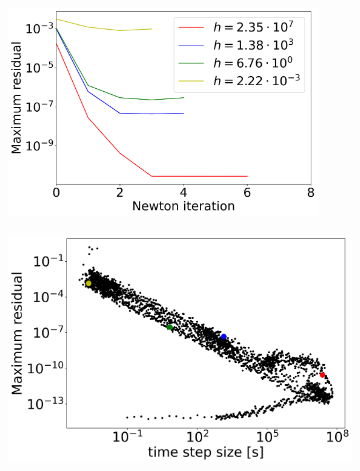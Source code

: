 \begin{figure}[H]
	\centering
	\begin{subfigure}[t]{0.32\textwidth}
		\centering
		\includegraphics[width=0.9\textwidth]{images/TANDEMConvergenceAnalysisCompactDAENewton_Size5.png}
		\label{fig:convergenceIssuesCompactDAENewtonIterations}
\end{subfigure}
	\begin{subfigure}[t]{0.32\textwidth}
		\centering
		\includegraphics[width=1\textwidth]{images/TANDEMConvergenceAnalysisCompactDAEMaxResidual_Size5.png}
		\label{fig:convergenceIssuesCompactDAEMaxResidual_vs_dt}
	\end{subfigure}
	\begin{subfigure}[t]{0.32\textwidth}
		\centering

\end{subfigure}
\end{figure}
